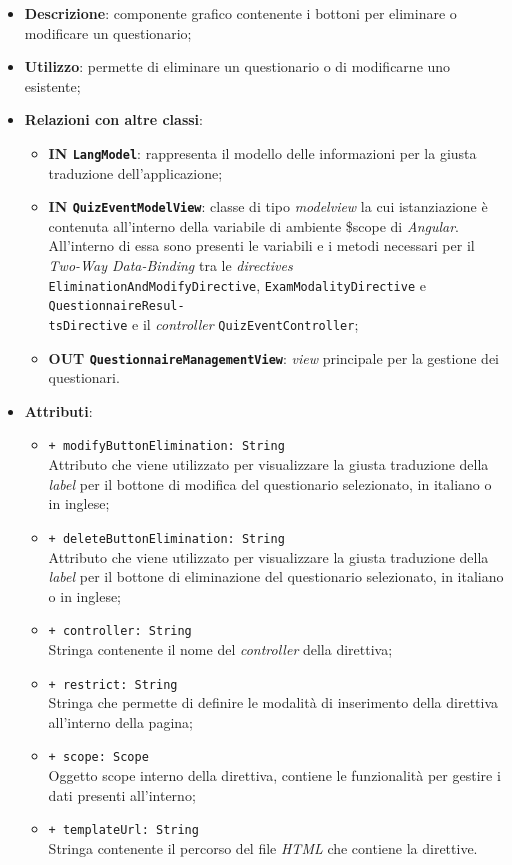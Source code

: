 \begin{itemize}
	\item \textbf{Descrizione}: componente grafico contenente i bottoni per eliminare o modificare un questionario;
	\item \textbf{Utilizzo}: permette di eliminare un questionario o di modificarne uno esistente;
	\item \textbf{Relazioni con altre classi}:
	\begin{itemize}
		\item \textbf{IN \texttt{LangModel}}: rappresenta il modello delle informazioni per la giusta traduzione dell'applicazione;
		\item \textbf{IN \texttt{QuizEventModelView}}: classe di tipo \textit{modelview} la cui istanziazione è contenuta all'interno della variabile di ambiente \$scope di \textit{Angular}. All'interno di essa sono presenti le variabili e i metodi necessari per il \textit{Two-Way Data-Binding} tra le \textit{directives} \texttt{EliminationAndModifyDirective}, \texttt{ExamModalityDirective} e \texttt{QuestionnaireResul-\\tsDirective} e il \textit{controller} \texttt{QuizEventController};
		\item \textbf{OUT \texttt{QuestionnaireManagementView}}: \textit{view} principale per la gestione dei questionari.
	\end{itemize}
	\item \textbf{Attributi}:
	\begin{itemize}
		\item \texttt{+ modifyButtonElimination: String} \\ Attributo che viene utilizzato per visualizzare la giusta traduzione della \textit{label} per il bottone di modifica del questionario selezionato, in italiano o in inglese; 
		\item \texttt{+ deleteButtonElimination: String} \\ Attributo che viene utilizzato per visualizzare la giusta traduzione della \textit{label} per il bottone di eliminazione del questionario selezionato, in italiano o in inglese;
		\item \texttt{+ controller: String} \\ Stringa contenente il nome del \textit{controller} della direttiva;
		\item \texttt{+ restrict: String} \\ Stringa che permette di definire le modalità di inserimento della direttiva all'interno della pagina;
		\item \texttt{+ scope: Scope} \\ Oggetto scope interno della direttiva, contiene le funzionalità per gestire i dati presenti all'interno;
		\item \texttt{+ templateUrl: String} \\ Stringa contenente il percorso del file \textit{HTML} che contiene la direttive.
	\end{itemize}
\end{itemize}